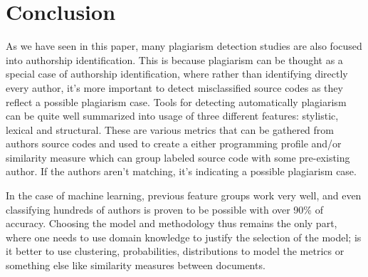 \documentclass[english]{tktltiki2}
\theoremstyle{definition}
\theoremstyle{remark}
\begin{document}
\section{Conclusion}

As we have seen in this paper, many plagiarism detection studies are also focused into authorship identification. This is because plagiarism can be thought as a special case of authorship identification, where rather than identifying directly every author, it's more important to detect misclassified source codes as they reflect a possible plagiarism case. Tools for detecting automatically plagiarism can be quite well summarized into usage of three different features: stylistic, lexical and structural. These are various metrics that can be gathered from authors source codes and used to create a either programming profile and/or similarity measure which can group labeled source code with some pre-existing author. If the authors aren't matching, it's indicating a possible plagiarism case. 

In the case of machine learning, previous feature groups work very well, and even classifying hundreds of authors is proven to be possible with over 90\% of accuracy. Choosing the model and methodology thus remains the only part, where one needs to use domain knowledge to justify the selection of the model; is it better to use clustering, probabilities, distributions to model the metrics or something else like similarity measures between documents.


%
%
%
%







% 
\end{document}
